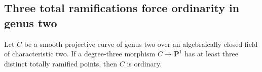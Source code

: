 \subsection{Three total ramifications force ordinarity in genus two}

\begin{lemma}
\label{lem:char2-genus-two-three-total-ramifications-candidate}
Let $C$ be a smooth projective curve of genus two over an algebraically
closed field of characteristic two. If a degree-three morphism
$C\to\mathbf P^1$ has at least three distinct totally ramified
points, then $C$ is ordinary.
\end{lemma}
